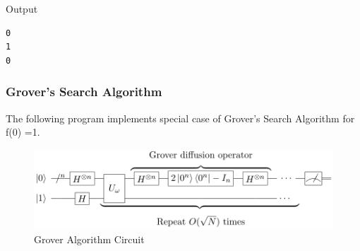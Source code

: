 Output
\begin{lstlisting}
0
1
0
\end{lstlisting}

\subsubsection {Grover's Search Algorithm}

The following program implements special case of Grover's Search Algorithm for f(0) =1.

\begin{figure}[h!]
\begin{center}
\includegraphics{ref/grover}
\end{center}
\caption{ Grover Algorithm Circuit 
\label{cir1}}
\end{figure}

